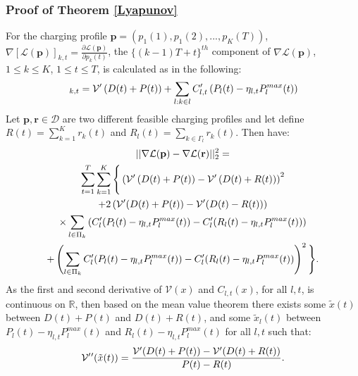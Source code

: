 \documentclass[12pt,draftcls,onecolumn]{IEEEtran}
\begin{document}
\subsubsection{Proof of Theorem \ref{Lyapunov}}\label{A1}
\indent For the charging profile $\mathbf{p}=(p_1(1), p_1(2), ..., p_K(T))$, $\nabla [\mathcal{L}(\mathbf{p})]_{k,t}=\frac{\partial \mathcal{L}(\mathbf{p})}{\partial p_k(t)}$, the $\{(k-1)T+t\}^{th}$ component of $\nabla \mathcal{L}(\mathbf{p})$, $1 \leq k \leq K$, $1 \leq t \leq T$, is calculated as in the following:\\
\begin{equation}
[\nabla \mathcal{L}(\mathbf{p}]_{k,t}= \mathcal{V}\rq{} \left (D(t)+P(t)\right)+\sum_{l:k \in l}C_{l,t}\rq{}\left(P_l(t)-\eta_{l,t} P_l^{max}(t)\right)
\label{nablaL}
\end{equation}
\indent Let $\mathbf{p}, \mathbf{r} \in \mathcal{D}$ are two different feasible charging profiles and let define $R(t)=\sum_{k=1}^{K}r_k(t)$ and $R_l(t)=\sum_{k \in \Gamma_l}r_k(t)$. Then have:
\begin{gather}
||\nabla \mathcal{L}(\mathbf{p}) - \nabla \mathcal{L}(\mathbf{r})||_2^2 = \nonumber \\
\sum_{t=1}^{T}\sum_{k=1}^{K} \Bigg{\{} \left( \mathcal{V}\rq{} \left( D(t)+P(t)\right) - \mathcal{V}\rq{} \left( D(t)+R(t)\right)\right)^2 \nonumber \\
+ 2 \left(\mathcal{V}\rq{}(D(t)+P(t))-\mathcal{V}\rq{}(D(t)-R(t))\right) \nonumber \\
\times \sum_{l \in \Pi_k}\left(C_l\rq{}(P_l(t)-\eta_{l,t}P_l^{max}(t))-C_l\rq{}(R_l(t)-\eta_{l,t}P_l^{max}(t))\right)\nonumber \\
+\left(\sum_{l \in \Pi_k}C_l\rq{}(P_l(t)-\eta_{l,t}P_l^{max}(t))-C_l\rq{}(R_l(t)-\eta_{l,t}P_l^{max}(t))\right)^2\Bigg{\}}.
\label{deltaL}
\end{gather}
\indent As the first and second derivative of $\mathcal{V}(x)$ and $C_{l,t}(x)$, for all $l, t$, is continuous on $\mathbb{R}$, then based on the mean value theorem there exists some $\tilde{x}(t)$ between $D(t)+P(t)$ and $D(t)+R(t)$, and some $\tilde{x}_l(t)$ between $P_l(t)-\eta_{l,t}P_l^{max}(t)$ and $R_l(t)-\eta_{l,t}P_l^{max}(t)$ for all $l, t$ such that:\\
\begin{equation}
\mathcal{V}\rq{}\rq{}(\tilde{x}(t))=\frac{\mathcal{V}\rq{}(D(t)+P(t))-\mathcal{V}\rq{}(D(t)+R(t))}{P(t)-R(t)}.\\
\label{MeanValueV}
\end{equation}
\end{document}
